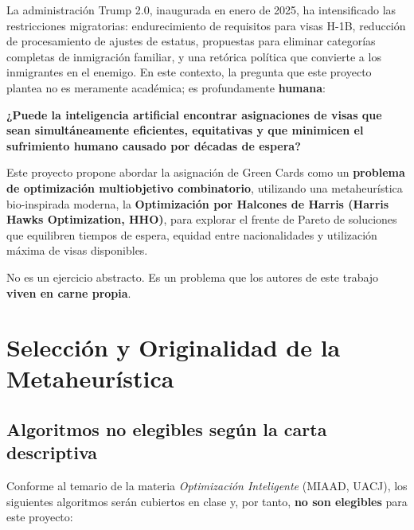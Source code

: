\documentclass[12pt,letterpaper]{article}
\begin{document}
La administración Trump 2.0, inaugurada en enero de 2025, ha intensificado las restricciones migratorias: endurecimiento de requisitos para visas H-1B, reducción de procesamiento de ajustes de estatus, propuestas para eliminar categorías completas de inmigración familiar, y una retórica política que convierte a los inmigrantes en el enemigo. En este contexto, la pregunta que este proyecto plantea no es meramente académica; es profundamente \textbf{humana}:

\begin{notebox}
\textbf{¿Puede la inteligencia artificial encontrar asignaciones de visas que sean simultáneamente eficientes, equitativas y que minimicen el sufrimiento humano causado por décadas de espera?}
\end{notebox}

Este proyecto propone abordar la asignación de Green Cards como un \textbf{problema de optimización multiobjetivo combinatorio}, utilizando una metaheurística bio-inspirada moderna, la \textbf{Optimización por Halcones de Harris (Harris Hawks Optimization, HHO)}, para explorar el frente de Pareto de soluciones que equilibren tiempos de espera, equidad entre nacionalidades y utilización máxima de visas disponibles.

No es un ejercicio abstracto. Es un problema que los autores de este trabajo \textbf{viven en carne propia}.

\section{Selección y Originalidad de la Metaheurística}

\subsection{Algoritmos no elegibles según la carta descriptiva}

Conforme al temario de la materia \textit{Optimización Inteligente} (MIAAD, UACJ), los siguientes algoritmos serán cubiertos en clase y, por tanto, \textbf{no son elegibles} para este proyecto:
\end{document}
